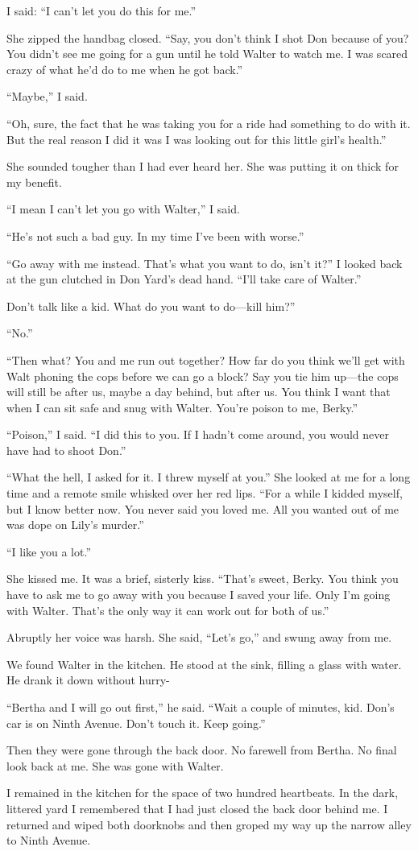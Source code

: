 \documentclass{novel}
\begin{document}
{I said: “I can’t let you do this for me.”

She zipped the handbag closed. “Say, you don’t think I shot Don because of you? You didn’t see me going for a gun until he told Walter to watch me. I was scared crazy of what he’d do to me when he got back.”

“Maybe,” I said.

“Oh, sure, the fact that he was taking you for a ride had something to do with it. But the real reason I did it was I was looking out for this little girl’s health.”

She sounded tougher than I had ever heard her. She was putting it on thick for my benefit.

“I mean I can’t let you go with Walter,” I said.

“He’s not such a bad guy. In my time I’ve been with worse.”

“Go away with me instead. That’s what you want to do, isn’t it?” I looked back at the gun clutched in Don Yard’s dead hand. “I’ll take care of Walter.”

Don’t talk like a kid. What do you want to do—kill him?”

“No.”

“Then what? You and me run out together? How far do you think we’ll get with Walt phoning the cops before we can go a block? Say you tie him up—the cops will still be after us, maybe a day behind, but after us. You think I want that when I can sit safe and snug with Walter. You’re poison to me, Berky.”

“Poison,” I said. “I did this to you. If I hadn’t come around, you would never have had to shoot Don.”

“What the hell, I asked for it. I threw myself at you.” She looked at me for a long time and a remote smile whisked over her red lips. “For a while I kidded myself, but I know better now. You never said you loved me. All you wanted out of me was dope on Lily’s murder.”

“I like you a lot.”

She kissed me. It was a brief, sisterly kiss. “That’s sweet, Berky. You think you have to ask me to go away with you because I saved your life. Only I’m going with Walter. That’s the only way it can work out for both of us.”

Abruptly her voice was harsh. She said, “Let’s go,” and swung away from me.

We found Walter in the kitchen. He stood at the sink, filling a glass with water. He drank it down without hurry-

“Bertha and I will go out first,” he said. “Wait a couple of minutes, kid. Don’s car is on Ninth Avenue. Don’t touch it. Keep going.”

Then they were gone through the back door. No farewell from Bertha. No final look back at me. She was gone with Walter.

I remained in the kitchen for the space of two hundred heartbeats. In the dark, littered yard I remembered that I had just closed the back door behind me. I returned and wiped both doorknobs and then groped my way up the narrow alley to Ninth Avenue.

}
\end{document}
